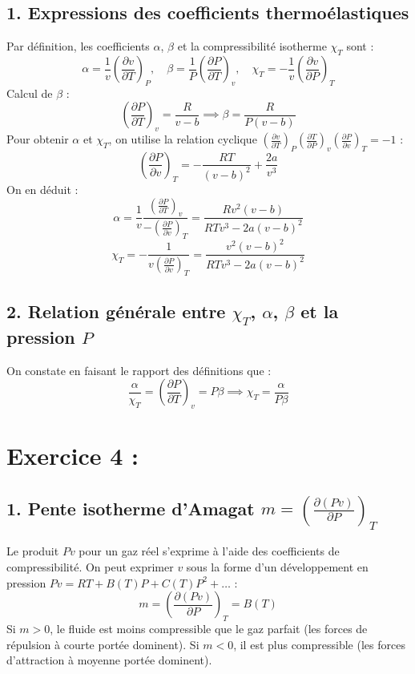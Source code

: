 \documentclass[a4paper,12pt]{article}
\begin{document}
 	\subsection*{1. Expressions des coefficients thermoélastiques}
 	Par définition, les coefficients $\alpha$, $\beta$ et la compressibilité isotherme $\chi_T$ sont :
 	\[ \alpha = \frac{1}{v} \left(\frac{\partial v}{\partial T}\right)_P, \quad \beta = \frac{1}{P} \left(\frac{\partial P}{\partial T}\right)_v, \quad \chi_T = -\frac{1}{v} \left(\frac{\partial v}{\partial P}\right)_T \]
 	Calcul de $\beta$ :
 	\[ \left(\frac{\partial P}{\partial T}\right)_v = \frac{R}{v-b} \implies \beta = \frac{R}{P(v-b)} \]
 	Pour obtenir $\alpha$ et $\chi_T$, on utilise la relation cyclique $\left(\frac{\partial v}{\partial T}\right)_P \left(\frac{\partial T}{\partial P}\right)_v \left(\frac{\partial P}{\partial v}\right)_T = -1$ :
 	\[ \left(\frac{\partial P}{\partial v}\right)_T = -\frac{RT}{(v-b)^2} + \frac{2a}{v^3} \]
 	On en déduit :
 	\[ \alpha = \frac{1}{v} \frac{\left(\frac{\partial P}{\partial T}\right)_v}{-\left(\frac{\partial P}{\partial v}\right)_T} = \frac{R v^2 (v-b)}{R T v^3 - 2a(v-b)^2} \]
 	\[ \chi_T = -\frac{1}{v \left(\frac{\partial P}{\partial v}\right)_T} = \frac{v^2 (v-b)^2}{R T v^3 - 2a(v-b)^2} \]
 	
 	\subsection*{2. Relation générale entre $\chi_T$, $\alpha$, $\beta$ et la pression $P$}
 	On constate en faisant le rapport des définitions que :
 	\[ \frac{\alpha}{\chi_T} = \left(\frac{\partial P}{\partial T}\right)_v = P\beta \implies \chi_T = \frac{\alpha}{P\beta} \]
 	
 	\newpage
 	
 	\section*{Exercice 4 : }
 	\subsection*{1. Pente isotherme d'Amagat $m = \left(\frac{\partial(Pv)}{\partial P}\right)_T$}
 	Le produit $Pv$ pour un gaz réel s'exprime à l'aide des coefficients de compressibilité. On peut exprimer $v$ sous la forme d'un développement en pression $Pv = RT + B(T)P + C(T)P^2 + \dots$ :
 	\[ m = \left(\frac{\partial(Pv)}{\partial P}\right)_T = B(T) \]
 	Si $m > 0$, le fluide est moins compressible que le gaz parfait (les forces de répulsion à courte portée dominent). Si $m < 0$, il est plus compressible (les forces d'attraction à moyenne portée dominent).
 	
\end{document}
